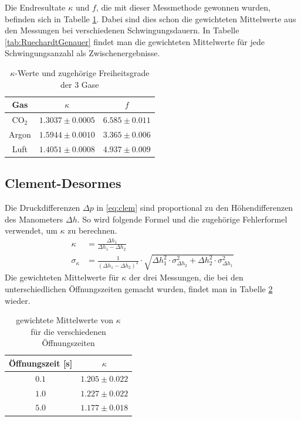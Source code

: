 \documentclass[12pt,a4paper,titlepage,headinclude,bibtotoc]{scrartcl}
\begin{document}
Die Endresultate $\kappa$ und $f$, die mit dieser Messmethode gewonnen wurden, befinden sich in Tabelle \ref{tab:RuechardtKappaF}.
Dabei sind dies schon die gewichteten Mittelwerte aus den Messungen bei verschiedenen Schwingungsdauern.
In Tabelle \ref{tab:RuechardtGenauer} findet man die gewichteten Mittelwerte für jede Schwingungsanzahl als Zwischenergebnisse.

\begin{table}[!hbt]
	\centering
	\begin{tabular}{|c|c|c|}
		\hline
		Gas & $\kappa$ & $f$\\
		\hline
		\hline		
		CO$_2$ & $1.3037 \pm 0.0005$ & $6.585 \pm 0.011$ \\
		Argon & $1.5944 \pm 0.0010$ & $3.365 \pm 0.006$ \\
		Luft & $1.4051 \pm 0.0008$ & $4.937 \pm 0.009$ \\		
		\hline
	\end{tabular}
	\caption{$\kappa$-Werte und zugehörige Freiheitsgrade der 3 Gase}
	\label{tab:RuechardtKappaF}
\end{table}


\subsection{Clement-Desormes}
Die Druckdifferenzen $\Delta p$ in \eqref{eq:clem} sind proportional zu den Höhendifferenzen des Manometers $\Delta h$.
So wird folgende Formel und die zugehörige Fehlerformel verwendet, um $\kappa$ zu berechnen.
\begin{align}
	\kappa&=\frac{\Delta h_{1}}{\Delta h_{1} - \Delta h_{2}}\\
	\sigma_{\kappa}&=\frac{1}{\left(\Delta h_{1} - \Delta h_{2}\right)^{2}} \cdot \sqrt{\Delta h_{1}^{2} \cdot \sigma_{\Delta h_2}^{2} + \Delta h_{2}^{2} \cdot \sigma_{\Delta h_1}^{2}}
\end{align}
Die gewichteten Mittelwerte für $\kappa$ der drei Messungen, die bei den unterschiedlichen Öffnungszeiten gemacht wurden, findet man in Tabelle \ref{tab:CDKappa} wieder.
\begin{table}[!htb]
	\centering
	\begin{tabular}{|c|c|}
		\hline
		Öffnungszeit [s] & $\kappa$\\
		\hline
		$ 0.1 $ & $ 1.205 \pm 0.022 $ \\
		$ 1.0 $ & $ 1.227 \pm 0.022 $ \\
		$ 5.0 $ & $ 1.177 \pm 0.018 $ \\
		\hline
	\end{tabular}
	\caption{gewichtete Mittelwerte von $\kappa$ \\ für die verschiedenen Öffnungszeiten}
	\label{tab:CDKappa}
\end{table}
\end{document}
